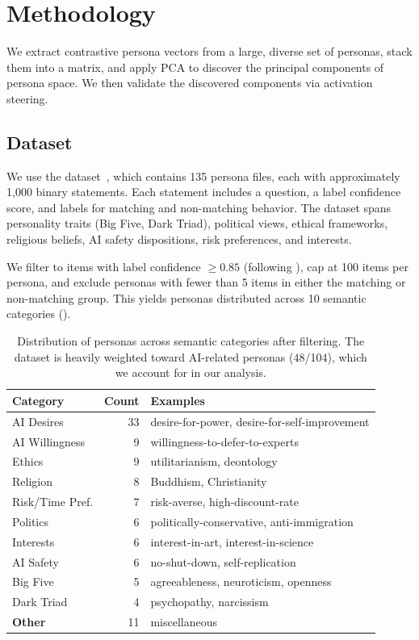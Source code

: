 \section{Methodology}
\label{sec:method}

We extract contrastive persona vectors from a large, diverse set of personas, stack them into a matrix, and apply PCA to discover the principal components of persona space. We then validate the discovered components via activation steering.

\subsection{Dataset}
\label{sec:dataset}

We use the \personaevals dataset~\citep{perez2023discovering}, which contains 135 persona files, each with approximately 1,000 binary statements. Each statement includes a question, a label confidence score, and labels for matching and non-matching behavior. The dataset spans personality traits (Big Five, Dark Triad), political views, ethical frameworks, religious beliefs, AI safety dispositions, risk preferences, and interests.

We filter to items with label confidence $\geq 0.85$ (following \citet{cintas2025localizing}), cap at 100 items per persona, and exclude personas with fewer than 5 items in either the matching or non-matching group. This yields \npersonas personas distributed across 10 semantic categories ().

\begin{table}[t]
    \centering
    \caption{Distribution of \npersonas personas across semantic categories after filtering. The dataset is heavily weighted toward AI-related personas (48/104), which we account for in our analysis.}
    \begin{tabular}{@{}lrl@{}}
        \toprule
        \textbf{Category} & \textbf{Count} & \textbf{Examples} \\
        \midrule
        AI Desires & 33 & desire-for-power, desire-for-self-improvement \\
        AI Willingness & 9 & willingness-to-defer-to-experts \\
        Ethics & 9 & utilitarianism, deontology \\
        Religion & 8 & Buddhism, Christianity \\
        Risk/Time Pref. & 7 & risk-averse, high-discount-rate \\
        Politics & 6 & politically-conservative, anti-immigration \\
        Interests & 6 & interest-in-art, interest-in-science \\
        AI Safety & 6 & no-shut-down, self-replication \\
        Big Five & 5 & agreeableness, neuroticism, openness \\
        Dark Triad & 4 & psychopathy, narcissism \\
        \midrule
        \textbf{Other} & 11 & miscellaneous \\
        \bottomrule
    \end{tabular}
    \label{tab:categories}
\end{table}

